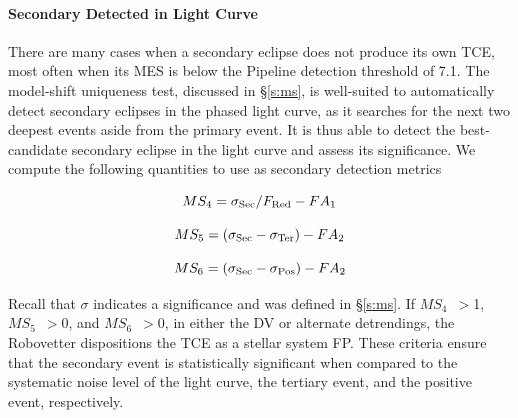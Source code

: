 \paragraph{Secondary Detected in Light Curve}
\label{secdetectsec}
\label{s:second}

There are many cases when a secondary eclipse does not produce its own TCE, most often when its MES is below the \kepler{} Pipeline detection threshold of 7.1. The model-shift uniqueness test, discussed in \S\ref{s:ms}, is well-suited to automatically detect secondary eclipses in the phased light curve, as it searches for the next two deepest events aside from the primary event. It is thus able to detect the best-candidate secondary eclipse in the light curve and assess its significance. We compute the following quantities to use as secondary detection metrics

\begin{equation}
    MS_{4} = \sigma_{\rm Sec}/F_{\rm Red} - FA_{1}
\end{equation}

\begin{equation}
    MS_{5} = (\sigma_{\rm Sec} - \sigma_{\rm Ter}) - FA_{2}
\end{equation}

\begin{equation}
    MS_{6} = (\sigma_{\rm Sec} - \sigma_{\rm Pos}) - FA_{2}
\end{equation}

Recall that $\sigma$ indicates a significance and was defined in \S\ref{s:ms}. If $MS_{4}$~$>$1, $MS_{5}$~$>$0, and $MS_{6}$~$>$0, in either the DV or alternate detrendings, the Robovetter dispositions the TCE as a stellar system FP. These criteria ensure that the secondary event is statistically significant when compared to the systematic noise level of the light curve, the tertiary event, and the positive event, respectively.

